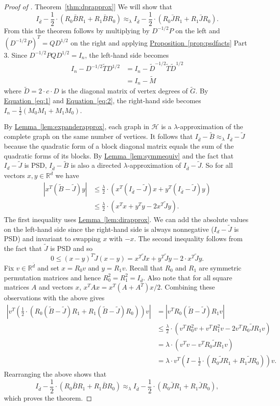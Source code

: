 \documentclass[11pt]{article}
\numberwithin{equation}{section}
\theoremstyle{definition}
\theoremstyle{plain}
\newcommand{\expref}[2]{\hyperref[#2]{#1~\ref{#2}}}
\newcommand{\expeqref}[2]{\hyperref[#2]{#1~\eqref{#2}}}
\newcommand{\wt}{\widetilde}   %
\numberwithin{myalgctr}{section}
\theoremstyle{named}
\begin{document}
\begin{proof}[Proof of \expref{Theorem}{thm:dprapprox}]
We will show that
\[
I_{\bar{d}}-\frac{1}{2}\cdot(R_0\bar{B}R_1+R_1\bar{B}R_0)\approx_{\lambda} I_{\bar{d}}-\frac{1}{2}\cdot(R_0\bar{J}R_1+R_1\bar{J}R_0).
\]
{}From this the theorem follows by multiplying by $D^{-1/2}P$ on the left and $(D^{-1/2}P)^T=QD^{1/2}$ on the right and applying \expref{Proposition}{prop:psdfacts} Part 3. Since $D^{-1/2}PQD^{1/2}=I_n$, the left-hand side becomes 
\begin{align*}
I_n-D^{-1/2}\wt{T}D^{1/2}&=I_n-\wt{D}^{-1/2}\wt{T}\wt{D}^{1/2}\\
&=I_n-\wt{M}
\end{align*}
where $\wt{D}=2\cdot c\cdot D$ is the diagonal matrix of vertex degrees of $\wt{G}$. By \expeqref{Equation}{eq:1} and \expeqref{Equation}{eq:2}, the right-hand side becomes $I_n-\frac{1}{2}(M_0M_1+M_1M_0)$.

By \expref{Lemma}{lem:expanderapprox}, each graph in $\mathcal{H}$ is a $\lambda$-approximation of the complete graph on the same number of vertices. It follows that $I_{\bar{d}}-\wt{B}\approx_\lambda I_{\bar{d}}-\wt{J}$  because the quadratic form of a block diagonal matrix equals the sum of the quadratic forms of its blocks. By \expref{Lemma}{lem:symmequiv} and the fact that $I_d-\wt{J}$ is PSD, $I_{\bar{d}}-\wt{B}$ is also a directed $\lambda$-approximation of $I_{\bar{d}}-\wt{J}$. So for all vectors $x,y\in\mathbb{R}^{\bar{d}}$ we have 
\begin{align*}
\left|x^{T}(\wt{B}-\wt{J})y\right| &\leq \frac{\lambda}{2}\cdot (x^{T}(I_{\bar{d}}-\wt{J})x+y^{T}(I_{\bar{d}}-\wt{J})y)\\
&\leq \frac{\lambda}{2}\cdot (x^{T}x + y^Ty - 2x^{T}\wt{J}y).
\end{align*}
The first inequality uses \expref{Lemma}{lem:dirapprox}. We can add the absolute values on the left-hand side since the right-hand side is always nonnegative ($I_d-\wt{J}$ is PSD) and invariant to swapping $x$ with $-x$. The second inequality follows from the fact that $\wt{J}$ is PSD and so 
\[
0 \leq (x-y)^{T}\wt{J}(x-y) = x^{T}\wt{J}x+y^{T}\wt{J}y-2\cdot x^{T}\wt{J}y.
\]
Fix $v\in\mathbb{R}^{\bar{d}}$ and set $x=R_0v$ and $y=R_1v$. Recall that $R_0$ and $R_1$ are symmetric permutation matrices and hence $R_0^2=R_1^2=I_{\bar{d}}$. Also note that for all square matrices $A$ and vectors $x$, $x^{T}Ax=x^{T}(A+A^{T})x/2$. Combining these observations with the above gives
\begin{align*}
\left|v^{T}\left(\frac{1}{2}\cdot\left(R_0(\wt{B}-\wt{J})R_1+R_1(\wt{B}-\wt{J})R_0\right)\right)v\right|&=\left|v^{T}R_0(\wt{B}-\wt{J})R_1v\right| \\
&\leq \frac{\lambda}{2}\cdot (v^{T}R_0^2v + v^TR_1^2v - 2v^{T}R_0\wt{J}R_1 v)\\
&=\lambda\cdot (v^{T}v-v^{T}R_0\wt{J}R_1 v)\\
&=\lambda\cdot v^{T}\left(I-\frac{1}{2}\cdot\left(R_0\wt{J}R_1+R_1\wt{J}R_0\right)\right)v.
\end{align*}
Rearranging the above shows that
\[
I_{\bar{d}}-\frac{1}{2}\cdot(R_0\bar{B}R_1+R_1\bar{B}R_0)\approx_{\lambda} I_{\bar{d}}-\frac{1}{2}\cdot(R_0\bar{J}R_1+R_1\bar{J}R_0),
\]
which proves the theorem.
\end{proof}
\end{document}

